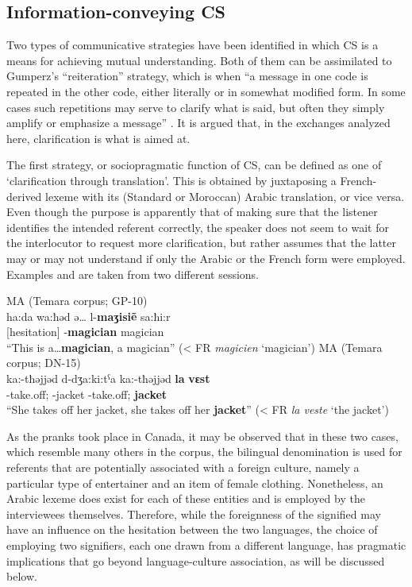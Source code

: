 \documentclass[output=paper]{langscibook}
\begin{document}
\subsection{Information-conveying \gls*{CS}}
Two types of communicative strategies have been identified in which \gls*{CS} is a means for achieving mutual understanding. Both of them can be assimilated to Gumperz’s “reiteration” strategy, which is when “a message in one code is repeated in the other code, either literally or in somewhat modified form. In some cases such repetitions may serve to clarify what is said, but often they simply amplify or emphasize a message” \citep[78]{gumperz_discourse_1982}. It is argued that, in the exchanges analyzed here, clarification is what is aimed at. 

The first strategy, or sociopragmatic function of \gls*{CS}, can be defined as one of ‘clarification through translation'. This is obtained by juxtaposing a French-derived lexeme with its (Standard or Moroccan) Arabic translation, or vice versa. Even though the purpose is apparently that of making sure that the listener identifies the intended referent correctly, the speaker does not seem to wait for the interlocutor to request more clarification, but rather assumes that the latter may or may not understand if only the Arabic or the French form were employed. Examples  and  are taken from two different sessions.

\begin{exe}
	\ex\label{falchetta:ex:9} \gls*{MA} (Temara corpus; GP-10) \\
	\gll ha:da   wa:ħǝd  {ǝ\dots} l-\textbf{maʒisiẽ} sa:ħi:r\\
	\DEM{} \INDF{} [hesitation] \DEF-\textbf{magician} magician \\
	\glt “This is a\dots \textbf{magician}, a magician” (< FR \textit{magicien} ‘magician’)
	\ex\label{falchetta:ex:10} \gls*{MA} (Temara corpus; DN-15) \\
	\gll ka:-tħǝjjǝd   d-dʒa:ki:tˁa   ka:-tħǝjjǝd   \textbf{la}   \textbf{vɛst} \\
	\PRVB-take.off;\Third\F\SG{} \DEF-jacket \PRVB-take.off;\Third\F\SG{} \textbf{\DET} \textbf{jacket} \\
	\glt “She takes off her jacket, she takes off her \textbf{jacket}” (< FR \textit{la veste} ‘the jacket’)
\end{exe}

\noindent
As the pranks took place in Canada, it may be observed that in these two cases, which resemble many others in the corpus, the bilingual denomination is used for referents that are potentially associated with a foreign culture, namely a particular type of entertainer and an item of female clothing. Nonetheless, an Arabic lexeme does exist for each of these entities and is employed by the interviewees themselves. Therefore, while the foreignness of the signified may have an influence on the hesitation between the two languages, the choice of employing two signifiers, each one drawn from a different language, has pragmatic implications that go beyond language-culture association, as will be discussed below. 
\end{document}
